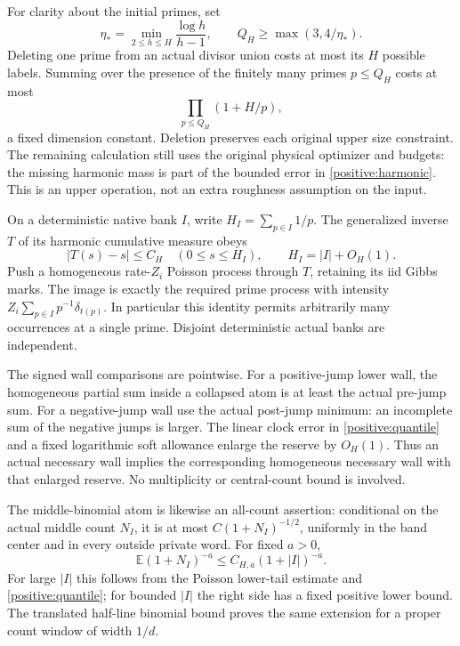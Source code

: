 For clarity about the initial primes, set
\[
 \eta_* =\min_{2\leq h\leq H}\frac{\log h}{h-1},
 \qquad Q_H\geq\max(3,4/\eta_*).
\]
Deleting one prime from an actual divisor union costs at most its $H$
possible labels. Summing over the presence of the finitely many primes
$p\leq Q_H$ costs at most
\[
 \prod_{p\leq Q_H}(1+H/p),
\]
a fixed dimension constant. Deletion preserves each original upper size
constraint. The remaining calculation still uses the original physical
optimizer and budgets: the missing harmonic mass is part of the bounded
error in \eqref{positive:harmonic}. This is an upper operation, not an
extra roughness assumption on the input.

On a deterministic native bank $I$, write
$H_I=\sum_{p\in I}1/p$. The generalized inverse $T$ of its harmonic
cumulative measure obeys
\begin{equation}
 |T(s)-s|\leq C_H\quad(0\leq s\leq H_I),
 \qquad H_I=|I|+O_H(1).
 \label{positive:quantile}
\end{equation}
Push a homogeneous rate-$Z_i$ Poisson process through $T$, retaining its
iid Gibbs marks. The image is exactly the required prime process with
intensity $Z_i\sum_{p\in I}p^{-1}\delta_{t(p)}$. In particular this
identity permits arbitrarily many occurrences at a single prime.
Disjoint deterministic actual banks are independent.

The signed wall comparisons are pointwise. For a positive-jump lower
wall, the homogeneous partial sum inside a collapsed atom is at least
the actual pre-jump sum. For a negative-jump wall use the actual post-jump
minimum: an incomplete sum of the negative jumps is larger. The linear
clock error in \eqref{positive:quantile} and a fixed logarithmic soft
allowance enlarge the reserve by $O_H(1)$. Thus an actual necessary wall
implies the corresponding homogeneous necessary wall with that enlarged
reserve. No multiplicity or central-count bound is involved.

The middle-binomial atom is likewise an all-count assertion:
conditional on the actual middle count $N_I$, it is at most
$C(1+N_I)^{-1/2}$, uniformly in the band center and in every outside
private word. For fixed $a>0$,
\begin{equation}
 \mathbb E(1+N_I)^{-a}\leq C_{H,a}(1+|I|)^{-a}.
 \label{positive:middle}
\end{equation}
For large $|I|$ this follows from the Poisson lower-tail estimate and
\eqref{positive:quantile}; for bounded $|I|$ the right side has a fixed
positive lower bound. The translated half-line binomial bound proves
the same extension for a proper count window of width $1/d$.

